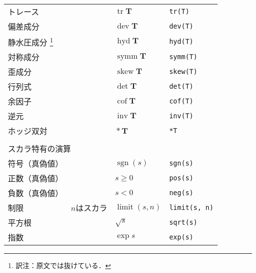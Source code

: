 \begin{longtable}{Xlll}
 トレース &  & $\mathop{\mathrm{tr}}\bm{T}$ & \verb|tr(T)| \\
\index{tensorのメンバかんすう@\OFclass{tensor}のメンバ関数!dev@\verb+dev+}%
\index{dev@\verb+dev+!tensorのメンバかんすう@\OFclass{tensor}のメンバ関数}%
 偏差成分 &  & $\mathop{\mathrm{dev}}\bm{T}$ & \verb|dev(T)| \\
 静水圧成分%
\footnote{訳注：原文では抜けている．}%
 &  & $\mathop{\mathrm{hyd}}\bm{T}$ & \verb|hyd(T)| \\
\index{tensorのメンバかんすう@\OFclass{tensor}のメンバ関数!symm@\verb+symm+}%
\index{symm@\verb+symm+!tensorのメンバかんすう@\OFclass{tensor}のメンバ関数}%
 対称成分 &  & $\mathop{\mathrm{symm}}\bm{T}$ & \verb|symm(T)| \\
\index{tensorのメンバかんすう@\OFclass{tensor}のメンバ関数!skew@\verb+skew+}%
\index{skew@\verb+skew+!tensorのメンバかんすう@\OFclass{tensor}のメンバ関数}%
 歪成分 &  & $\mathop{\mathrm{skew}}\bm{T}$ & \verb|skew(T)| \\
\index{tensorのメンバかんすう@\OFclass{tensor}のメンバ関数!det@\verb+det+}%
\index{det@\verb+det+!tensorのメンバかんすう@\OFclass{tensor}のメンバ関数}%
 行列式 &  & $\det\bm{T}$ & \verb|det(T)| \\
\index{tensorのメンバかんすう@\OFclass{tensor}のメンバ関数!cof@\verb+cof+}%
\index{cof@\verb+cof+!tensorのメンバかんすう@\OFclass{tensor}のメンバ関数}%
 余因子 &  & $\mathop{\mathrm{cof}}\bm{T}$ & \verb|cof(T)| \\
\index{tensorのメンバかんすう@\OFclass{tensor}のメンバ関数!inv@\verb+inv+}%
\index{inv@\verb+inv+!tensorのメンバかんすう@\OFclass{tensor}のメンバ関数}%
 逆元 &  & $\mathop{\mathrm{inv}}\bm{T}$ & \verb|inv(T)| \\
 ホッジ双対 &  & $\mathop{*}\bm{T}$ & \verb|*T| \\
 \\
 \multicolumn{4}{l}{\sffamily\gtfamily スカラ特有の演算} \\
 \hline
 符号（真偽値） &  & $\mathop{\mathrm{sgn}}(s)$ & \verb|sgn(s)| \\
 正数（真偽値） &  & $s \ge 0$ & \verb|pos(s)| \\
 負数（真偽値） &  & $s < 0$ & \verb|neg(s)| \\
 制限 & $n$はスカラ & $\mathop{\mathrm{limit}}(s, n)$ & \verb|limit(s, n)| \\
 平方根 &  & $\sqrt{s}$ & \verb|sqrt(s)| \\
 指数 &  & $\exp s$ & \verb|exp(s)| \\

\end{longtable}
